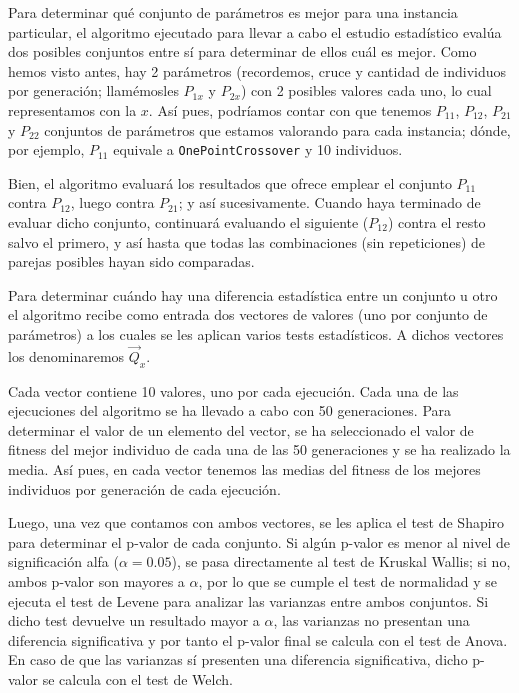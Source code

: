 Para determinar qué conjunto de parámetros es mejor para una instancia particular, el algoritmo ejecutado para llevar a cabo el estudio estadístico evalúa dos posibles conjuntos entre sí para determinar de ellos cuál es mejor. Como hemos visto antes, hay 2 parámetros (recordemos, cruce y cantidad de individuos por generación; llamémosles $P_{1x}$ y $P_{2x}$) con 2 posibles valores cada uno, lo cual representamos con la $x$. Así pues, podríamos contar con que tenemos $P_{11}$, $P_{12}$, $P_{21}$ y $P_{22}$ conjuntos de parámetros que estamos valorando para cada instancia; dónde, por ejemplo, $P_{11}$ equivale a \texttt{OnePointCrossover} y 10 individuos. 

Bien, el algoritmo evaluará los resultados que ofrece emplear el conjunto $P_{11}$ contra $P_{12}$, luego contra $P_{21}$; y así sucesivamente. Cuando haya terminado de evaluar dicho conjunto, continuará evaluando el siguiente ($P_{12}$) contra el resto salvo el primero, y así hasta que todas las combinaciones (sin repeticiones) de parejas posibles hayan sido comparadas.

Para determinar cuándo hay una diferencia estadística entre un conjunto u otro el algoritmo recibe como entrada dos vectores de valores (uno por conjunto de parámetros) a los cuales se les aplican varios tests estadísticos. A dichos vectores los denominaremos $\vec{Q}_x$.

Cada vector contiene 10 valores, uno por cada ejecución. Cada una de las ejecuciones del algoritmo se ha llevado a cabo con 50 generaciones. Para determinar el valor de un elemento del vector, se ha seleccionado el valor de fitness del mejor individuo de cada una de las 50 generaciones y se ha realizado la media. Así pues, en cada vector tenemos las medias del fitness de los mejores individuos por generación de cada ejecución.

Luego, una vez que contamos con ambos vectores, se les aplica el test de Shapiro para determinar el p-valor de cada conjunto. Si algún p-valor es menor al nivel de significación alfa ($\alpha = 0.05$), se pasa directamente al test de Kruskal Wallis; si no, ambos p-valor son mayores a $\alpha$, por lo que se cumple el test de normalidad y se ejecuta el test de Levene para analizar las varianzas entre ambos conjuntos. Si dicho test devuelve un resultado mayor a $\alpha$, las varianzas no presentan una diferencia significativa y por tanto el p-valor final se calcula con el test de Anova. En caso de que las varianzas sí presenten una diferencia significativa, dicho p-valor se calcula con el test de Welch.


